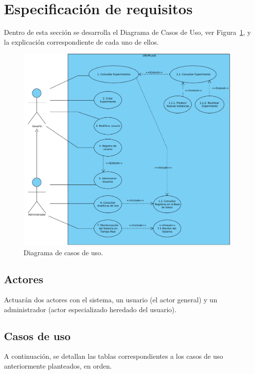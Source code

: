 \section{Especificación de requisitos}

Dentro de esta sección se desarrolla el Diagrama de Casos de Uso, ver Figura~\ref{img:diagrama-casos-uso}, y la explicación correspondiente de cada uno de ellos.

\begin{figure}[h!]
	\centering
	\includegraphics[scale=0.5]{../img/anexos/requisitos/Casos-de-uso}
	\caption{Diagrama de casos de uso.}\label{img:diagrama-casos-uso}
\end{figure}

\subsection{Actores}
Actuarán dos actores con el sistema, un usuario (el actor general) y un administrador (actor especializado heredado del usuario).

\subsection{Casos de uso}\label{casos-de-uso}
A continuación, se detallan las tablas correspondientes a los casos de uso anteriormente planteados, en orden.

